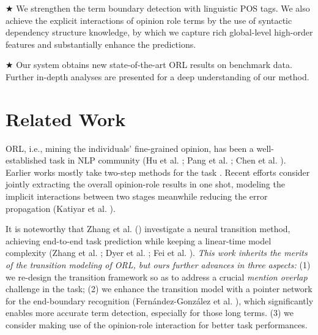 \documentclass[letterpaper]{article} \usepackage{aaai22}  \usepackage{times}  \usepackage{helvet}  \usepackage{courier}  \usepackage[hyphens]{url}  \usepackage{graphicx} \urlstyle{rm} \def\UrlFont{\rm}  \usepackage{natbib}  \usepackage{caption} \DeclareCaptionStyle{ruled}{labelfont=normalfont,labelsep=colon,strut=off} \frenchspacing  \setlength{\pdfpagewidth}{8.5in}  \setlength{\pdfpageheight}{11in}  \usepackage{algorithm}
\begin{document}
$\bigstar$ We strengthen the term boundary detection with linguistic POS tags.
We also achieve the explicit interactions of opinion role terms by the use of syntactic dependency structure knowledge, by which we capture rich global-level high-order features and substantially enhance the predictions. 



$\bigstar$ Our system obtains new state-of-the-art ORL results on benchmark data.
Further in-depth analyses are presented for a deep understanding of our method.











 




\section{Related Work}


ORL, i.e., mining the individuals' fine-grained opinion, has been a well-established task in NLP community (Hu et al. \citeyear{HuL04}; Pang et al. \citeyear{PangL07}; Chen et al. \citeyear{ChenC16}).
Earlier works mostly take two-step methods for the task \cite{BreckCC07,yang-cardie-2012-extracting,marasovic-frank-2018-srl4orl,zhang-etal-2019-enhancing}.
Recent efforts consider jointly extracting the overall opinion-role results in one shot, modeling the implicit interactions between two stages meanwhile reducing the error propagation (Katiyar et al. \citeyear{katiyar-cardie-2016-investigating}).




It is noteworthy that Zhang et al. (\citeyear{ZhangWF19}) investigate a neural transition method, achieving end-to-end task prediction while keeping a linear-time model complexity (Zhang et al. \citeyear{zhang-clark-2010-fast}; Dyer et al. \citeyear{dyer-etal-2015-transition}; Fei et al. \citeyear{0001ZLJ21}).
\textit{This work inherits the merits of the transition modeling of ORL, but ours further advances in three aspects:}
(1) we re-design the transition framework so as to address a crucial \emph{mention overlap} challenge in the task;
(2) we enhance the transition model with a pointer network for the end-boundary recognition (Fern{\'a}ndez-Gonz{\'a}lez et al. \citeyear{fernandez-2020-transition}), which significantly enables more accurate term detection, especially for those long terms.
(3) we consider making use of the opinion-role interaction for better task performances.
\end{document}
